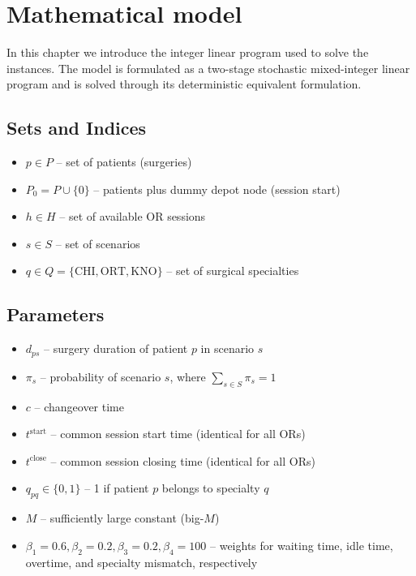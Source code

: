 \section{Mathematical model}
\label{sec:mathematical_model}
In this chapter we introduce the integer linear program used to solve the instances. 
The model is formulated as a two-stage stochastic mixed-integer linear program and
is solved through its deterministic equivalent formulation.

\subsection{Sets and Indices}

\begin{itemize}
  \item $p \in P$ -- set of patients (surgeries)
  \item $P_0 = P \cup \{0\}$ -- patients plus dummy depot node (session start)
  \item $h \in H$ -- set of available OR sessions
  \item $s \in S$ -- set of scenarios
  \item $q \in Q = \{\text{CHI},\text{ORT},\text{KNO}\}$ -- set of surgical
        specialties
\end{itemize}

\subsection{Parameters}

\begin{itemize}
  \item $d_{ps}$ -- surgery duration of patient $p$ in scenario $s$
  \item $\pi_s$ -- probability of scenario $s$,
        where $\sum_{s \in S} \pi_s = 1$
  \item $c$ -- changeover time
  \item $t^{\text{start}}$ -- common session start time (identical for all ORs)
  \item $t^{\text{close}}$ -- common session closing time (identical for all
        ORs)
  \item $q_{pq} \in \{0,1\}$ -- 1 if patient $p$ belongs to specialty $q$
  \item $M$ -- sufficiently large constant (big-$M$)
  \item $\beta_1=0.6, \beta_2=0.2, \beta_3=0.2, \beta_4=100$ -- weights for waiting time, idle
        time, overtime, and specialty mismatch, respectively
\end{itemize}

